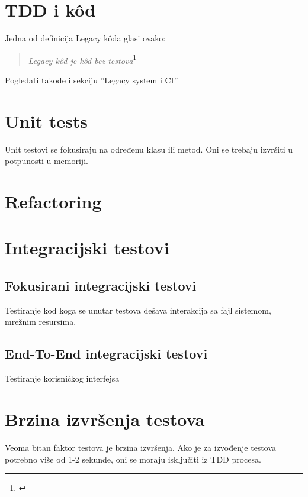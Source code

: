 \documentclass[times, utf8, seminar]{fit}
\begin{document}
\section{TDD i  k\^od}

Jedna od definicija Legacy k\^oda glasi ovako:
\begin{quote}
  \emph{Legacy k\^od je k\^od bez testova}\footnote{\citep[str. 303]{agileart}}
\end{quote}

Pogledati takođe i sekciju ''Legacy system i CI''\citep[str. 3]{agileci}

\section{Unit tests}

Unit testovi se fokusiraju na određenu klasu ili metod. Oni se trebaju izvršiti u potpunosti u memoriji.\citep[str. 300]{agileart}

\section{Refactoring}

\section{Integracijski testovi}

\subsection{Fokusirani integracijski testovi}

Testiranje kod koga se unutar testova dešava interakcija sa fajl sistemom, mrežnim resursima.

\subsection{End-To-End integracijski testovi}

Testiranje korisničkog interfejsa

\section{Brzina izvršenja testova}

Veoma bitan faktor testova je brzina izvršenja. Ako je za izvođenje testova potrebno više od 1-2 sekunde, oni se moraju isključiti iz TDD procesa. 
\end{document}
